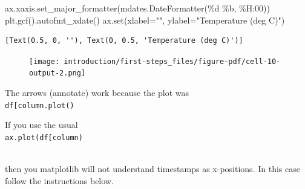 \documentclass[
  letterpaper,
  DIV=11,
  numbers=noendperiod,
  oneside]{scrreprt}
\newenvironment{Shaded}{\begin{snugshade}}{\end{snugshade}}
\newcommand{\BuiltInTok}[1]{\textcolor[rgb]{0.00,0.23,0.31}{#1}}
\newcommand{\NormalTok}[1]{\textcolor[rgb]{0.00,0.23,0.31}{#1}}
\newcommand{\OperatorTok}[1]{\textcolor[rgb]{0.37,0.37,0.37}{#1}}
\newcommand{\SpecialCharTok}[1]{\textcolor[rgb]{0.37,0.37,0.37}{#1}}
\newcommand{\StringTok}[1]{\textcolor[rgb]{0.13,0.47,0.30}{#1}}
\begin{document}
\begin{Shaded}
\begin{Highlighting}[]
\NormalTok{ax.xaxis.set\_major\_formatter(mdates.DateFormatter(}\StringTok{\textquotesingle{}}\SpecialCharTok{\%d}\StringTok{ \%b, \%H:00\textquotesingle{}}\NormalTok{))}
\NormalTok{plt.gcf().autofmt\_xdate()}
\NormalTok{ax.}\BuiltInTok{set}\NormalTok{(xlabel}\OperatorTok{=}\StringTok{""}\NormalTok{,}
\NormalTok{       ylabel}\OperatorTok{=}\StringTok{"Temperature (deg C)"}\NormalTok{)}
\end{Highlighting}
\end{Shaded}

\begin{verbatim}
[Text(0.5, 0, ''), Text(0, 0.5, 'Temperature (deg C)')]
\end{verbatim}

\begin{figure}[H]

{\centering \texttt{[image: introduction/first-steps\_files/figure-pdf/cell-10-output-2.png]}

}

\end{figure}

The arrows (annotate) work because the plot was\\
\texttt{df{[}\textquotesingle{}column\textquotesingle{}{]}.plot()}

If you use the usual\\
\texttt{ax.plot(df{[}\textquotesingle{}column\textquotesingle{}{]})}\strut \\
then you matplotlib will not understand timestamps as x-positions. In
this case follow the instructions below.
\end{document}
